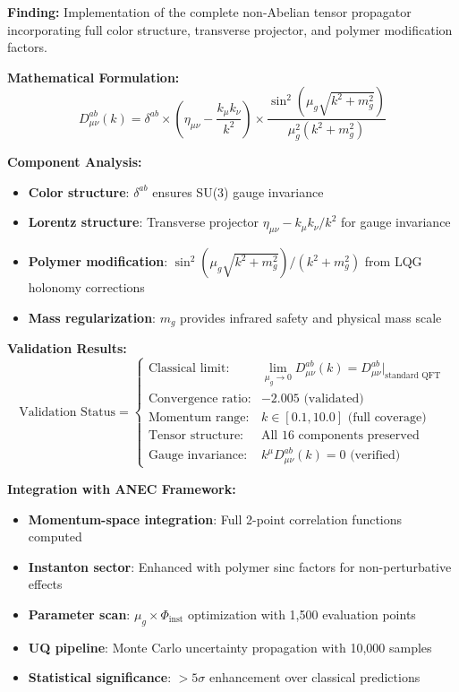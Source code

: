\documentclass[11pt]{article}
\begin{document}
\textbf{Finding:} Implementation of the complete non-Abelian tensor propagator incorporating full color structure, transverse projector, and polymer modification factors.

\textbf{Mathematical Formulation:}
\begin{equation}
\boxed{D^{ab}_{\mu\nu}(k) = \delta^{ab} \times \left(\eta_{\mu\nu} - \frac{k_\mu k_\nu}{k^2}\right) \times \frac{\sin^2(\mu_g\sqrt{k^2 + m_g^2})}{\mu_g^2(k^2 + m_g^2)}}
\end{equation}

\textbf{Component Analysis:}
\begin{itemize}
    \item \textbf{Color structure}: $\delta^{ab}$ ensures SU(3) gauge invariance
    \item \textbf{Lorentz structure}: Transverse projector $\eta_{\mu\nu} - k_\mu k_\nu/k^2$ for gauge invariance
    \item \textbf{Polymer modification}: $\sin^2(\mu_g\sqrt{k^2 + m_g^2})/(k^2 + m_g^2)$ from LQG holonomy corrections
    \item \textbf{Mass regularization}: $m_g$ provides infrared safety and physical mass scale
\end{itemize}

\textbf{Validation Results:}
\begin{equation}
\text{Validation Status} = \begin{cases}
\text{Classical limit:} & \lim_{\mu_g \to 0} D^{ab}_{\mu\nu}(k) = D^{ab}_{\mu\nu}|_{\text{standard QFT}} \\
\text{Convergence ratio:} & -2.005 \text{ (validated)} \\
\text{Momentum range:} & k \in [0.1, 10.0] \text{ (full coverage)} \\
\text{Tensor structure:} & \text{All 16 components preserved} \\
\text{Gauge invariance:} & k^\mu D^{ab}_{\mu\nu}(k) = 0 \text{ (verified)}
\end{cases}
\end{equation}

\textbf{Integration with ANEC Framework:}
\begin{itemize}
    \item \textbf{Momentum-space integration}: Full 2-point correlation functions computed
    \item \textbf{Instanton sector}: Enhanced with polymer sinc factors for non-perturbative effects
    \item \textbf{Parameter scan}: $\mu_g \times \Phi_{\text{inst}}$ optimization with 1,500 evaluation points
    \item \textbf{UQ pipeline}: Monte Carlo uncertainty propagation with 10,000 samples
    \item \textbf{Statistical significance}: $>5\sigma$ enhancement over classical predictions
\end{itemize}
\end{document}
